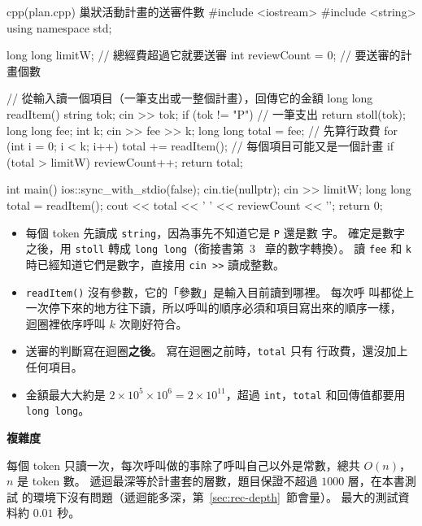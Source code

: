 \begin{example}[label=ex:rec-plans]{cpp}{(plan.cpp) 巢狀活動計畫的送審件數}
#include <iostream>
#include <string>
using namespace std;

long long limitW;          // 總經費超過它就要送審
int reviewCount = 0;       // 要送審的計畫個數

// 從輸入讀一個項目（一筆支出或一整個計畫），回傳它的金額
long long readItem() {
    string tok;
    cin >> tok;
    if (tok != "P") {                 // 一筆支出
        return stoll(tok);
    }
    long long fee;
    int k;
    cin >> fee >> k;
    long long total = fee;            // 先算行政費
    for (int i = 0; i < k; i++) {
        total += readItem();          // 每個項目可能又是一個計畫
    }
    if (total > limitW) {
        reviewCount++;
    }
    return total;
}

int main() {
    ios::sync_with_stdio(false);
    cin.tie(nullptr);
    cin >> limitW;
    long long total = readItem();
    cout << total << ' ' << reviewCount << '\n';
    return 0;
}
\end{example}


\begin{itemize}
\item 每個 token 先讀成 \texttt{string}，因為事先不知道它是 \texttt{P} 還是數
字。 確定是數字之後，用 \texttt{stoll} 轉成 \texttt{long long}（銜接書第~3~
章的數字轉換）。 讀 \texttt{fee} 和 \texttt{k} 時已經知道它們是數字，直接用
\texttt{cin >>} 讀成整數。
\item \texttt{readItem()} 沒有參數，它的「參數」是輸入目前讀到哪裡。 每次呼
叫都從上一次停下來的地方往下讀，所以呼叫的順序必須和項目寫出來的順序一樣，
迴圈裡依序呼叫 $k$ 次剛好符合。
\item 送審的判斷寫在迴圈\textbf{之後}。 寫在迴圈之前時，\texttt{total} 只有
行政費，還沒加上任何項目。
\item 金額最大大約是 $2 \times 10^5 \times 10^6 = 2 \times 10^{11}$，超過
\texttt{int}，\texttt{total} 和回傳值都要用 \texttt{long long}。
\end{itemize}

\textbf{複雜度}

每個 token 只讀一次，每次呼叫做的事除了呼叫自己以外是常數，總共 $O(n)$，$n$
是 token 數。 遞迴最深等於計畫套的層數，題目保證不超過 $1000$ 層，在本書測試
的環境下沒有問題（遞迴能多深，第~\ref{sec:rec-depth}~節會量）。 最大的測試資
料約 $0.01$ 秒。

